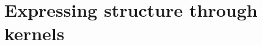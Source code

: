 \documentclass[twoside]{article}
\begin{document}




\section{Expressing structure through kernels} 
\label{sec:Structure}
\end{document}
